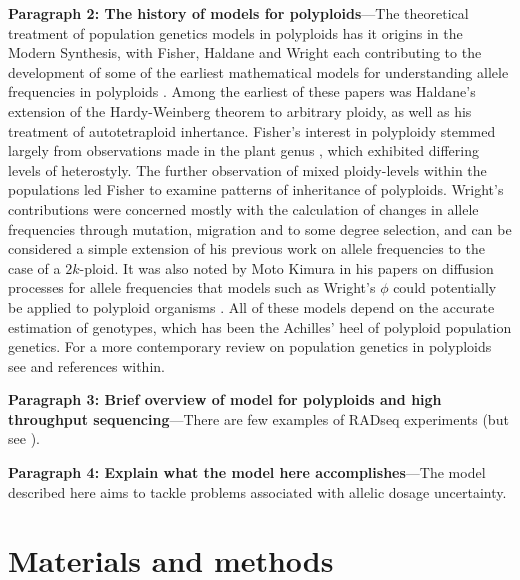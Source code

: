 \documentclass[11pt,english,letterpaper,oneside]{article}
\begin{document}
\textbf{Paragraph 2: The history of models for polyploids}---The theoretical treatment of population genetics models in polyploids has it origins in the Modern Synthesis, with  Fisher, Haldane and Wright each contributing to the development of some of the earliest mathematical models for understanding allele frequencies in polyploids \citep{haldane1930autopolyploids,wright1938polyploid,}. Among the earliest of these papers was Haldane's extension of the Hardy-Weinberg theorem to arbitrary ploidy, as well as his treatment of autotetraploid inhertance. Fisher's interest in polyploidy stemmed largely from observations made in the plant genus , which exhibited differing levels of heterostyly. The further observation of mixed ploidy-levels within the populations led Fisher to examine patterns of inheritance of polyploids. Wright's contributions were concerned mostly with the calculation of changes in allele frequencies through mutation, migration and to some degree selection, and can be considered a simple extension of his previous work on allele frequencies to the case of a $2k$-ploid. \cite{moody1993autopolyploids} It was also noted by Moto Kimura in his papers on diffusion processes for allele frequencies that models such as Wright's $\phi$ could potentially be applied to polyploid organisms \citep{kimura1964diffusion}. All of these models depend on the accurate estimation of genotypes, which has been the Achilles' heel of polyploid population genetics. For a more contemporary review on population genetics in polyploids see \cite{dufresne2014polyPopGen} and references within.
\medskip

\textbf{Paragraph 3: Brief overview of model for polyploids and high throughput sequencing}---There are few examples of RADseq experiments (but see \citep{logan-young2015polyploidSNP}).
\medskip

\textbf{Paragraph 4: Explain what the model here accomplishes}---The model described here aims to tackle problems associated with allelic dosage uncertainty.
\medskip

\section*{Materials and methods}                  %
\end{document}
